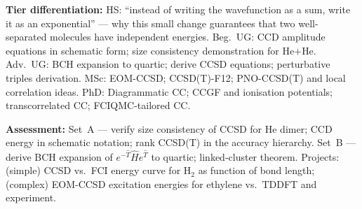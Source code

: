 \documentclass[11pt,a4paper]{article}
\begin{document}
\begin{tcolorbox}[modulebox, title={Module~II.1 / L04: Coupled-Cluster Methods}]
\medskip\textbf{Tier differentiation:}
HS: ``instead of writing the wavefunction as a sum, write it as an exponential'' ---
why this small change guarantees that two well-separated molecules have independent energies.
Beg.\ UG: CCD amplitude equations in schematic form; size consistency demonstration for He$+$He.
Adv.\ UG: BCH expansion to quartic; derive CCSD equations; perturbative triples derivation.
MSc: EOM-CCSD; CCSD(T)-F12; PNO-CCSD(T) and local correlation ideas.
PhD: Diagrammatic CC; CCGF and ionisation potentials; transcorrelated CC; FCIQMC-tailored CC.

\medskip\textbf{Assessment:}
Set~A --- verify size consistency of CCSD for He dimer; CCD energy in schematic notation;
rank CCSD(T) in the accuracy hierarchy.
Set~B --- derive BCH expansion of $e^{-\hat{T}}\hat{H}e^{\hat{T}}$ to quartic; linked-cluster theorem.
Projects: (simple) CCSD vs.\ FCI energy curve for H$_2$ as function of bond length;
(complex) EOM-CCSD excitation energies for ethylene vs.\ TDDFT and experiment.
\end{tcolorbox}

\medskip
\end{document}
